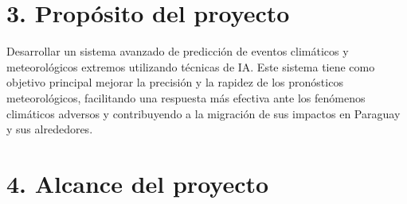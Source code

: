 \documentclass[
11pt, %
codirector, %
]{charter}
\begin{document}
\section{3. Propósito del proyecto}
\label{sec:proposito}

Desarrollar un sistema avanzado de predicción de eventos climáticos y meteorológicos extremos utilizando técnicas de IA. Este sistema tiene como objetivo principal mejorar la precisión y la rapidez de los pronósticos meteorológicos, facilitando una respuesta más efectiva ante los fenómenos climáticos adversos y contribuyendo a la migración de sus impactos en Paraguay y sus alrededores.

\section{4. Alcance del proyecto}
\label{sec:alcance}
\end{document}
